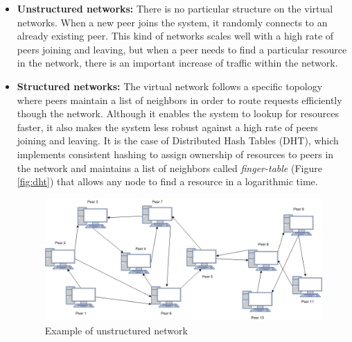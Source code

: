 \begin{itemize}
    \item \textbf{Unstructured networks:} There is no particular structure on the virtual networks. When a new peer joins the system, it randomly connects to an already existing peer. This kind of networks scales well with a high rate of peers joining and leaving, but when a peer needs to find a particular resource in the network, there is an important increase of traffic within the network.\cite{structured-p2p}    
    
    \item \textbf{Structured networks:} The virtual network follows a specific topology where peers maintain a list of neighbors in order to route requests efficiently though the network. Although it enables the system to lookup for resources faster, it also makes the system less robust against a high rate of peers joining and leaving. It is the case of Distributed Hash Tables (DHT)\cite{dht}, which implements consistent hashing to assign ownership of resources to peers in the network and maintains a list of neighbors called \textit{finger-table} (Figure \ref{fig:dht}) that allows any node to find a resource in a logarithmic time.
    
\begin{figure}[h!]
\centering
    \includegraphics[width=\linewidth]{assets/images/p2p.png}
    \caption{Example of unstructured network}
    \label{fig:client-server}
\end{figure}    
    
\end{itemize} 
